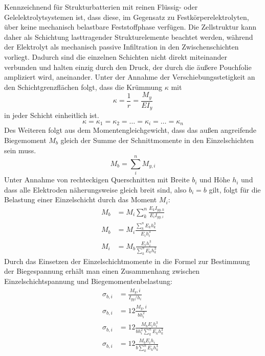 Kennzeichnend für Strukturbatterien mit reinen Flüssig- oder Gelelektrolytsystemen ist, dass diese, im Gegensatz zu Festkörperelektrolyten, über keine mechanisch belastbare Feststoffphase verfügen. Die Zellstruktur kann daher als Schichtung lasttragender Strukturelemente beachtet werden, während der Elektrolyt als mechanisch passive Infiltration in den Zwischenschichten vorliegt.
Dadurch sind die einzelnen Schichten nicht direkt miteinander verbunden und halten einzig durch den Druck, der durch die äußere Pouchfolie ampliziert wird, aneinander. Unter der Annahme der Verschiebungsstetigkeit an den Schichtgrenzflächen folgt, dass die Krümmung $\kappa$ mit
\begin{equation}
    \label{eq:curvature}
    \kappa = \frac{1}{r} = \frac{M_y}{E I_y}
\end{equation}
in jeder Schicht einheitlich ist.
\begin{equation}
    \kappa = \kappa_1 = \kappa_2 = \dots = \kappa_i = \dots = \kappa_n
\end{equation}
Des Weiteren folgt aus dem Momentengleichgewicht, dass das außen angreifende Biegemoment $M_{b}$ gleich der Summe der Schnittmomente in den Einzelschichten sein muss.
\begin{equation}
    M_{b} = \sum_{i}^{n}M_{y,i}
\end{equation}
Unter Annahme von rechteckigen Querschnitten mit Breite $b_i$ und Höhe $h_i$ und dass alle Elektroden näherungsweise gleich breit sind, also $b_i = b$ gilt, folgt für die Belastung einer Einzelschicht durch das Moment $M_i$:
\begin{align}
    M_{b} &= M_i \sum_{k}^{n}\frac{E_k I_{yy,k}}{E_i I_{yy,i}}\\
    M_{b} &= M_i \frac{\sum_{k}^{n} E_k h_k^3}{E_i h_i^3}\\
    M_i &= M_{b} \frac{ E_i h_i^3} { \sum_{k}^{n}E_k h_k^3}
\end{align}
Durch das Einsetzen der Einzelschichtmomente in die Formel zur Bestimmung der Biegespannung erhält man einen Zusammenhang zwischen Einzelschichtspannung und Biegemomentenbelastung:
\begin{align}
    \sigma_{b,i} &= \frac{M_y,i}{I_{yy}/h_i} \\
    \sigma_{b,i} &= 12 \frac{ M_y,i}{b h_i^2}\\
    \sigma_{b,i} &= 12 \frac{M_{b} E_i h_i^3}{b h_i^2 \sum_{k}^{n}E_k h_k^3}\\
    \sigma_{b,i} &= 12 \frac{M_{b} E_i h_i}{b \sum_{k}^{n}E_k h_k^3}
\end{align}

